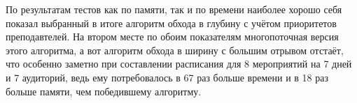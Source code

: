 По результатам тестов как по памяти, так и по времени наиболее хорошо себя показал выбранный в итоге алгоритм обхода в глубину с учётом приоритетов преподавтелей. На втором месте по обоим показателям многопоточная версия этого алгоритма, а вот алгоритм обхода в ширину с большим отрывом отстаёт, что особенно заметно при составлении расписания для 8 мероприятий на 7 дней и 7 аудиторий, ведь ему потребовалось в 67 раз больше времени и в 18 раз больше памяти, чем победившему алгоритму.





